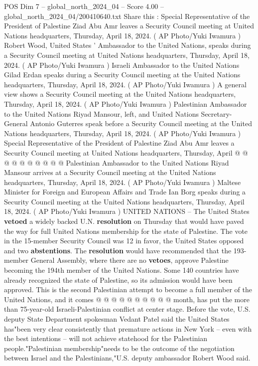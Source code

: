 \begin{textsample}{POS Dim 7 – global\_north\_2024\_04 – Score 4.00 – global\_north\_2024\_04/200410640.txt}  \label{ex:f7_pos_221}
Share this : Special Representative of the President of Palestine Ziad Abu Amr leaves a Security Council meeting at United Nations headquarters, Thursday, April 18, 2024. ( AP Photo/Yuki Iwamura ) Robert Wood, United States ' Ambassador to the United Nations, speaks during a Security Council meeting at United Nations headquarters, Thursday, April 18, 2024. ( AP Photo/Yuki Iwamura ) Israeli Ambassador to the United Nations Gilad Erdan speaks during a Security Council meeting at the United Nations headquarters, Thursday, April 18, 2024. ( AP Photo/Yuki Iwamura ) A general view shows a Security Council meeting at the United Nations headquarters, Thursday, April 18, 2024. ( AP Photo/Yuki Iwamura ) Palestinian Ambassador to the United Nations Riyad Mansour, left, and United Nations Secretary-General Antonio Guterres speak before a Security Council meeting at the United Nations headquarters, Thursday, April 18, 2024. ( AP Photo/Yuki Iwamura ) Special Representative of the President of Palestine Ziad Abu Amr leaves a Security Council meeting at United Nations headquarters, Thursday, April @ @ @ @ @ @ @ @ @ @ Palestinian Ambassador to the United Nations Riyad Mansour arrives at a Security Council meeting at the United Nations headquarters, Thursday, April 18, 2024. ( AP Photo/Yuki Iwamura ) Maltese Minister for Foreign and European Affairs and Trade Ian Borg speaks during a Security Council meeting at the United Nations headquarters, Thursday, April 18, 2024. ( AP Photo/Yuki Iwamura ) UNITED NATIONS -- The United States \textbf{vetoed} a widely backed U.N. \textbf{resolution} on Thursday that would have paved the way for full United Nations membership for the state of Palestine.
The vote in the 15-member Security Council was 12 in favor, the United States opposed and two \textbf{abstentions}.
The \textbf{resolution} would have recommended that the 193-member General Assembly, where there are no \textbf{vetoes}, approve Palestine becoming the 194th member of the United Nations.
Some 140 countries have already recognized the state of Palestine, so its admission would have been approved.
This is the second Palestinian attempt to become a full member of the United Nations, and it comes @ @ @ @ @ @ @ @ @ @ month, has put the more than 75-year-old Israeli-Palestinian conflict at center stage.
Before the vote, U.S. deputy State Department spokesman Vedant Patel said the United States has"been very clear consistently that premature actions in New York -- even with the best intentions -- will not achieve statehood for the Palestinian people."Palestinian membership"needs to be the outcome of the negotiation between Israel and the Palestinians,"U.S. deputy ambassador Robert Wood said.

\end{textsample}
